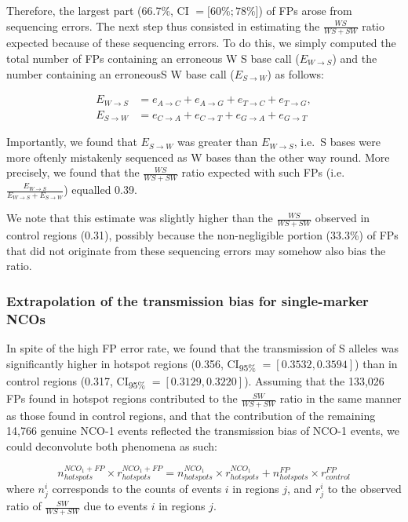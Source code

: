 Therefore, the largest part (66.7\%, CI $= [60\%; 78\%$]) of FPs arose from sequencing errors.
The next step thus consisted in estimating the $\frac{WS}{WS+SW}$ ratio expected because of these sequencing errors.
To do this, we simply computed the total number of FPs containing an erroneous W\textrightarrow{} S base call ($E_{W\rightarrow S}$) and the number containing an erroneousS\textrightarrow{} W base call ($E_{S\rightarrow W}$) as follows:

\begin{align}
        E_{W\rightarrow S}&= e_{A\rightarrow C} + e_{A\rightarrow G} + e_{T\rightarrow C} + e_{T\rightarrow G}, \\
        E_{S\rightarrow W}&= e_{C\rightarrow A} + e_{C\rightarrow T} + e_{G\rightarrow A} + e_{G\rightarrow T}
\end{align}

Importantly, we found that $E_{S\rightarrow W}$ was greater than $E_{W\rightarrow S}$, i.e.\ S bases were more oftenly mistakenly sequenced as W bases than the other way round.
More precisely, we found that the $\frac{WS}{WS+SW}$ ratio expected with such FPs (i.e.\ $\frac{E_{W\rightarrow S}}{E_{W\rightarrow S} + E_{S\rightarrow W}}$) equalled 0.39.

We note that this estimate was slightly higher than the $\frac{WS}{WS+SW}$ observed in control regions (0.31), possibly because the non-negligible portion (33.3\%) of FPs that did not originate from these sequencing errors may somehow also bias the ratio.




\subsubsection{Extrapolation of the transmission bias for single-marker NCOs}

In spite of the high FP error rate, we found that the transmission of S alleles was significantly higher in hotspot regions (0.356, CI\textsubscript{95\%} $=[0.3532, 0.3594]$) than in control regions (0.317, CI\textsubscript{95\%} $=[0.3129,0.3220]$). 
Assuming that the 133,026 FPs found in hotspot regions contributed to the $\frac{SW}{WS+SW}$ ratio in the same manner as those found in control regions, and that the contribution of the remaining 14,766 genuine NCO-1 events reflected the transmission bias of NCO-1 events, we could deconvolute both phenomena as such:

\begin{equation*}
	n_{hotspots}^{NCO_1 + FP} \times r_{hotspots}^{NCO_1 + FP}  = n_{hotspots}^{NCO_1} \times r_{hotspots}^{NCO_1} + n_{hotspots}^{FP} \times r_{control}^{FP}
\end{equation*}
where $n_{j}^{i}$ corresponds to the counts of events $i$ in regions $j$, and $r_{j}^{i}$ to the observed ratio of $\frac{SW}{WS+SW}$ due to events $i$ in regions $j$.


